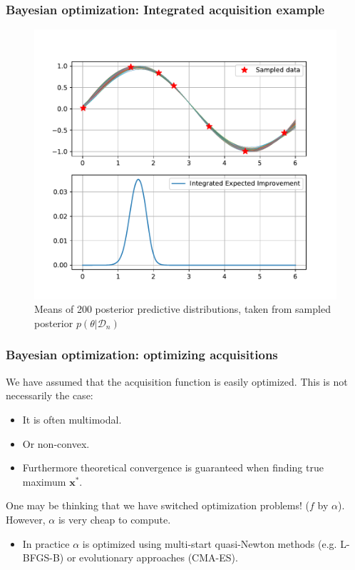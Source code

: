 \documentclass[10pt]{beamer}
\begin{document}
		\begin{frame}
		\frametitle{Bayesian optimization: Integrated acquisition example}
		\begin{figure}
		\caption{Means of 200 posterior predictive distributions, taken from sampled posterior $p(\theta|\mathcal{D}_n)$}
		\includegraphics[scale=0.4]{../figures/chapter3/integratedacq}
		\end{figure}
		\end{frame}
		
		\begin{frame}
		\frametitle{Bayesian optimization: optimizing acquisitions}
		We have assumed that the acquisition function is easily optimized. This is not necessarily the case:
		
		\begin{itemize}
		\item It is often multimodal.
		\item Or non-convex.
		\item Furthermore theoretical convergence is guaranteed when finding true maximum $\boldsymbol{x}^{*}$.
		\end{itemize}
		
		One may be thinking that we have switched optimization problems! ($f$ by $\alpha$). However, $\alpha$ 			is very cheap to compute.\\
		\begin{itemize}
		\item In practice $\alpha$ is optimized using multi-start quasi-Newton methods (e.g. L-BFGS-B) or 					evolutionary approaches (CMA-ES).
		\end{itemize}
		\end{frame}
		
\end{document}
